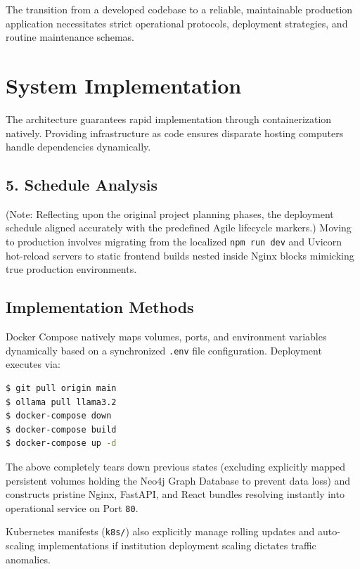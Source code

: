 \documentclass[12pt,a4paper]{report}
\begin{document}
The transition from a developed codebase to a reliable, maintainable production application necessitates strict operational protocols, deployment strategies, and routine maintenance schemas.

\section{System Implementation}

The architecture guarantees rapid implementation through containerization natively. Providing infrastructure as code ensures disparate hosting computers handle dependencies dynamically.

\subsection{5. Schedule Analysis}
(Note: Reflecting upon the original project planning phases, the deployment schedule aligned accurately with the predefined Agile lifecycle markers.) Moving to production involves migrating from the localized \texttt{npm run dev} and Uvicorn hot-reload servers to static frontend builds nested inside Nginx blocks mimicking true production environments.

\subsection{Implementation Methods}
Docker Compose natively maps volumes, ports, and environment variables dynamically based on a synchronized \texttt{.env} file configuration. 
Deployment executes via:
\begin{lstlisting}[language=bash, caption=Production Deployment Sequence]
$ git pull origin main
$ ollama pull llama3.2
$ docker-compose down
$ docker-compose build
$ docker-compose up -d
\end{lstlisting}
The above completely tears down previous states (excluding explicitly mapped persistent volumes holding the Neo4j Graph Database to prevent data loss) and constructs pristine Nginx, FastAPI, and React bundles resolving instantly into operational service on Port \texttt{80}. 

Kubernetes manifests (\texttt{k8s/}) also explicitly manage rolling updates and auto-scaling implementations if institution deployment scaling dictates traffic anomalies.
\end{document}
